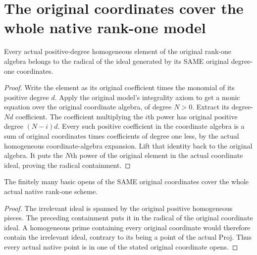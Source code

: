 \section{The original coordinates cover the whole native rank-one model}

\begin{lemma}
\label{lem:fc-native-rank-one-coordinate-radical}
\leanok
{}
Every actual positive-degree homogeneous element of the original
rank-one algebra belongs to the radical of the ideal generated by its
SAME original degree-one coordinates.
\end{lemma}
\begin{proof}
Write the element as its original coefficient times the monomial of its
positive degree $d$. Apply the original model's integrality axiom to get
a monic equation over the original coordinate algebra, of degree $N>0$.
Extract its degree-$Nd$ coefficient. The coefficient multiplying the
$i$th power has original positive degree $(N-i)d$. Every such positive
coefficient in the coordinate algebra is a sum of original coordinates
times coefficients of degree one less, by the actual homogeneous
coordinate-algebra expansion. Lift that identity back to the original
algebra. It puts the $N$th power of the original element in the actual
coordinate ideal, proving the radical containment.
\end{proof}

\begin{theorem}
\label{thm:fc-native-rank-one-coordinate-cover}
\leanok
{}
The finitely many basic opens of the SAME original coordinates cover the
whole actual native rank-one scheme.
\end{theorem}
\begin{proof}
The irrelevant ideal is spanned by the original positive homogeneous
pieces. The preceding containment puts it in the radical of the original
coordinate ideal. A homogeneous prime containing every original
coordinate would therefore contain the irrelevant ideal, contrary to
its being a point of the actual Proj. Thus every actual native point is
in one of the stated original coordinate opens.
\end{proof}
